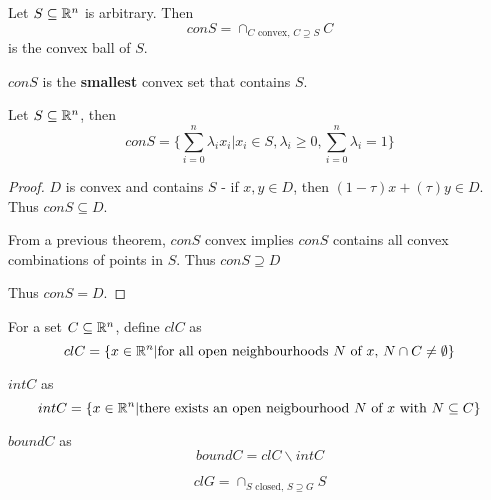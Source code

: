 \begin{defn}
  \label{defn:convexity:8}
  Let $S \subseteq \mathbb{R}^{n}$ is arbitrary. Then
  \begin{equation}
    \label{eq:21}
  con S = \cap_{\text{$C$ convex, $C \supseteq S$}} C  
  \end{equation}
  is the convex ball of $S$.
\end{defn}

\begin{remark}
  $con S$ is the \textbf{smallest} convex set that contains $S$.
\end{remark}

\begin{thm}
  \label{defn:convexity:9}
  Let $S \subseteq \mathbb{R}^{n}$, then
  \begin{equation}
    \label{eq:22}
    con S = \{ \sum_{i=0}^{n} \lambda_{i} x_{i} | x_{i} \in S,
    \lambda_{i} \geq 0, \sum_{i=0}^{n} \lambda_{i} = 1 \}
  \end{equation}
\end{thm}

\begin{proof}
  $D$ is convex and contains $S$ - if $x, y \in D$, then $(1-\tau)x +
  (\tau)y \in D$.  Thus $con S \subseteq D$.

  From a previous theorem, $con S$ convex implies $con S$ contains all
  convex combinations of points in $S$.  Thus $con S \supseteq D$

  Thus $con S = D$.
\end{proof}

\begin{defn}
  \label{defn:convexity:10}
  For a set $C \subseteq \mathbb{R}^{n}$, define $cl C$ as
  \begin{equation}
    \label{eq:23}
    cl C = \{ x \in \mathbb{R}^{n} | \text{for all open neighbourhoods $N$ of
      $x$, $N \cap C \neq \emptyset$} \}
  \end{equation}

  $int C$ as
  \begin{equation}
    \label{eq:24}
    int C = \{ x \in \mathbb{R}^{n} | \text{there exists an open neigbourhood $N$ of
      $x$ with $N \subseteq C$} \}
  \end{equation}

  $bound C$ as
  \begin{equation}
    \label{eq:25}
    bound C = cl C \backslash int C
  \end{equation}
\end{defn}

\begin{remark}
  \begin{equation}
    \label{eq:26}
    cl G = \cap_{\text{$S$ closed, $S \supseteq G$}} S
  \end{equation}
\end{remark}

